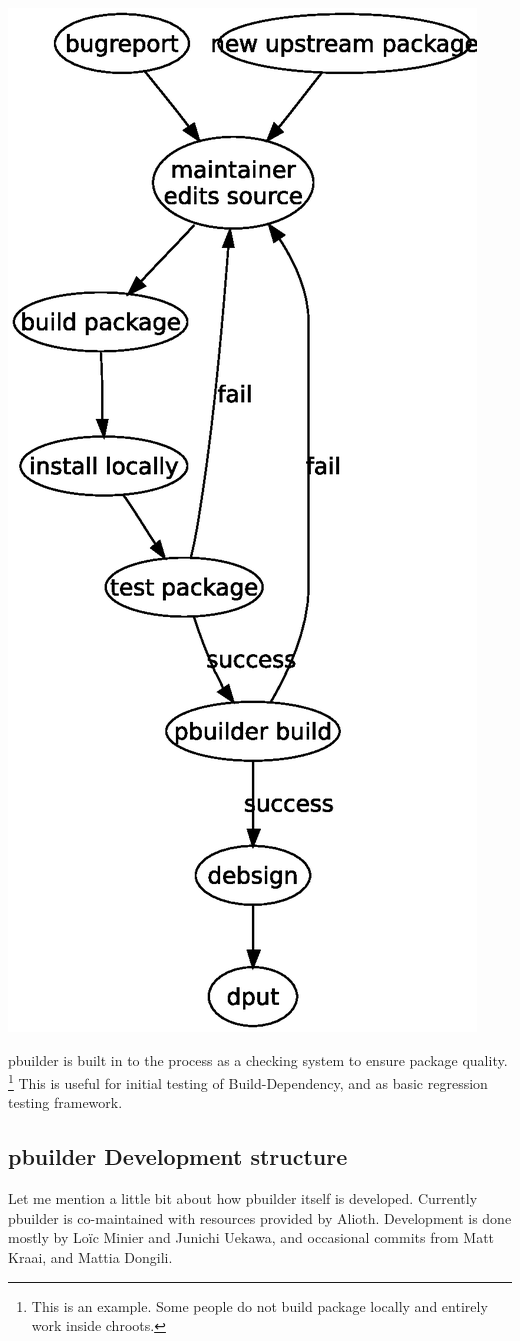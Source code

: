 \documentclass[a4paper]{article}
\begin{document}
\begin{center}
 \includegraphics[width=0.6\hsize]{develcycle.eps}
\end{center}

pbuilder is built in to the process as a checking system to ensure
package quality.  \footnote{This is an example. Some people do not build
package locally and entirely work inside chroots.}  This is useful for
initial testing of Build-Dependency, and as basic regression testing
framework.

\subsection{pbuilder Development structure}

Let me mention a little bit about how pbuilder itself is developed.
Currently pbuilder is co-maintained with resources provided by Alioth.
Development is done mostly by Lo\"ic Minier and Junichi Uekawa, and
occasional commits from Matt Kraai, and Mattia Dongili.
\end{document}
